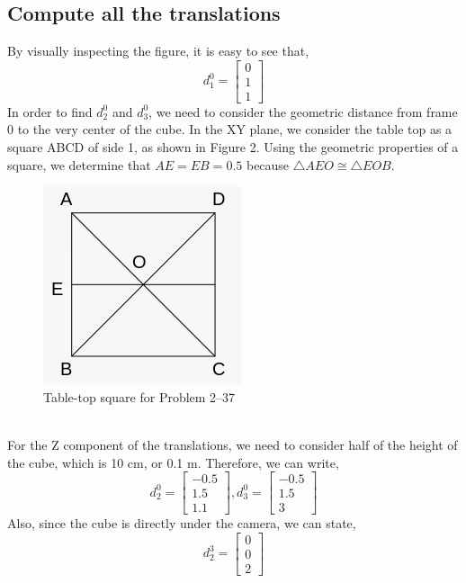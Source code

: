 \documentclass[conference]{IEEEtran}
\begin{document}
\subsection{Compute all the translations}
By visually inspecting the figure, it is easy to see that,
\[
    d^0_1 = \begin{bmatrix}
        0\\
        1\\
        1
    \end{bmatrix}
\]
In order to find $d^0_2$ and $d^0_3$, we need to consider
the geometric distance from frame 0 to the very center of the cube.
In the XY plane, we consider the table top as a square ABCD of side 1,
as shown in Figure 2. Using the geometric properties of a square, we
determine that $AE = EB = 0.5$ because $\triangle AEO \cong \triangle EOB$.
\begin{figure}[h]
    \includegraphics[scale=0.5]{./tabletop.png}
    \centering
    \caption{Table-top square for Problem 2--37}
\end{figure}\\
For the Z component of the translations, we need to consider half of the height
of the cube, which is 10 cm, or 0.1 m. Therefore, we can write,
\[
    d^0_2 = \begin{bmatrix}
        -0.5\\
        1.5\\
        1.1
    \end{bmatrix},
    d^0_3 = \begin{bmatrix}
        -0.5\\
        1.5\\
        3
    \end{bmatrix}
\]
Also, since the cube is directly under the camera, we can state,
\[
    d^3_2 = \begin{bmatrix}
        0\\
        0\\
        2
    \end{bmatrix}
\]
\vspace{0.1in}
\end{document}

